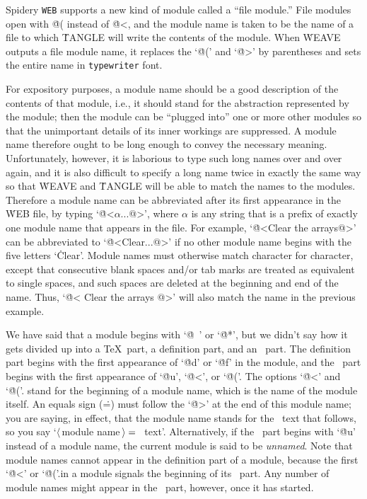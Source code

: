 \newstuff
Spidery {\tt WEB} supports a new kind of module called a ``file
module.''
File modules open with \.{@(} instead of \.{@<}, and the module name
 is taken to be the name of a file to which \.{TANGLE} will write the
contents of the module.
When \.{WEAVE}
outputs a file module name, it replaces the `\.{@(}' and `\.{@>}' by
parentheses and sets the entire name in {\tt typewriter} font.
\endnewstuff


For expository purposes, a module name should be a good description of the
contents of that module, i.e., it should stand for the abstraction
represented by the module; then the module can be ``plugged into'' one or
more other modules so that the unimportant details of its inner workings
are suppressed.
A module name therefore ought to be long enough to convey
the necessary meaning.
Unfortunately, however, it is laborious to type
such long names over and over again, and it is also difficult to specify a
long name twice in exactly the same way so that \.{WEAVE} and \.{TANGLE}
will be able to match the names to the modules.
Therefore a module name
can be abbreviated after its first appearance in the \.{WEB} file, by
typing `\.{@<$\alpha$...@>}', where $\alpha$ is any string that is a prefix of
exactly one module name that appears in the file.
For example, `\.{@<Clear
the arrays@>}' can be abbreviated to `\.{@<Clear...@>}' if no other module
name begins with the five letters `\.{Clear}'.
Module names must otherwise
match character for character, except that consecutive blank spaces and/or
tab marks are treated as equivalent to single spaces, and such spaces are
deleted at the beginning and end of the name.
Thus, `\.{@< Clear { }the
arrays @>}' will also match the name in the previous example.

We have said that a module begins with `\.{@\ }' or `\.{@*}', but we
didn't say how it gets divided up into a \TeX\ part, a definition part,
and an \PASCAL\ part.
The definition part begins with the first appearance
of `\.{@d}' or `\.{@f}' in the module, and the \PASCAL\ part begins with
the first appearance of `\.{@u}', `\.{@<}', 
\newstuff or `\.{@(}'.\endnewstuff
The 
 options `\.{@<}' \newstuff and `\.{@(}'.\endnewstuff
stand for the beginning of a module name, which is the name of the module
itself.
An equals sign (\.=) must follow the `\.{@>}' at the end of this
module name; you are saying, in effect, that the module name stands for
the \PASCAL\ text that follows, so you say `$\langle\,$module
name$\,\rangle=\null$\PASCAL\ text'.
Alternatively, if the \PASCAL\ part
begins with `\.{@u}' instead of a module name, the current module is said
to be {\sl unnamed}.
Note that module names cannot appear in the
definition part of a module, because the first `\.{@<}' \newstuff or
`\.{@(}'.\endnewstuff in a module
signals the beginning of its \PASCAL\ part.
Any number of module names
might appear in the \PASCAL\ part, however, once it has started.

